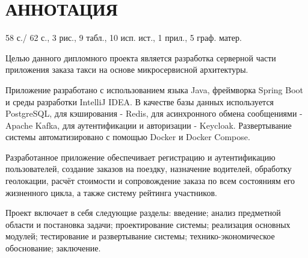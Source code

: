 \documentclass[a4paper, oneside]{report}
\newcommand{\sectionbreak}{\clearpage}
\newcommand\redline{\hspace{1.5cm}} %
\newcommand\titlespace{\vspace{26pt}} %
\newcommand\gostFont{\cyrillicfont \englishfont \fontsize{13pt}{15.6pt}\selectfont} %
\newcommand\gostTitleFont{\cyrillicfont \englishfont \fontsize{13pt}{0pt}\selectfont \bfseries} %
\begin{document}
 



	

	\sectionbreak \section*{
		\gostTitleFont
		\redline 
		АННОТАЦИЯ
	}
	
	\titlespace
	
	{\gostFont
	
	\par \redline 58 с./ 62 с.,  3 рис.,  9 табл., 10 исп. ист., 1 прил., 5 граф. матер.
	
	\par \redline 

	\par \redline Целью данного дипломного проекта является разработка серверной части приложения заказа такси на основе микросервисной архитектуры. 
	
	\par \redline Приложение разработано с использованием языка Java, фреймворка Spring Boot и среды разработки IntelliJ IDEA. В качестве базы данных используется PostgreSQL, для кэширования - Redis, для асинхронного обмена сообщениями - Apache Kafka, для аутентификации и авторизации - Keycloak. Развертывание системы автоматизировано с помощью Docker и Docker Compose. 
	
	\par \redline Разработанное приложение обеспечивает регистрацию и аутентификацию пользователей, создание заказов на поездку, назначение водителей, обработку геолокации, расчёт стоимости и сопровождение заказа по всем состояниям его жизненного цикла, а также систему рейтинга участников.
	 
	\par \redline Проект включает в себя следующие разделы: введение; анализ предметной области и постановка задачи; проектирование системы; реализация основных модулей; тестирование и развертывание системы; технико-экономическое обоснование; заключение. 

	\par 
	
    }
	
\end{document}
